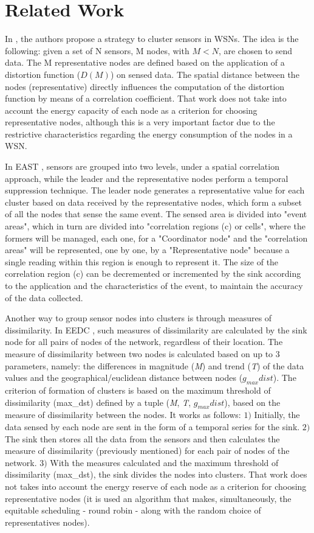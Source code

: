 \documentclass[conference]{IEEEtran}
\begin{document}
\section{Related Work}
\label{related-work}

In \cite{Vuran2004}, the authors propose a strategy to cluster sensors in WSNs.
The idea is the following: given a set of N sensors, M nodes, with $M < N$, are
chosen to send data. The M representative nodes are defined based on the
application of a distortion function ($D(M)$) on sensed data.
The spatial distance between the nodes (representative) directly influences the
computation of the distortion function by means of a correlation coefficient.
That work does not take into account the energy capacity of each node as a
criterion for choosing representative nodes, although this is a very important
factor due to the restrictive characteristics regarding the energy consumption
of the nodes in a WSN.

In EAST \cite{Villas2012}, sensors are grouped into two levels, under a spatial
correlation approach, while the leader and the representative nodes perform a
temporal suppression technique.
The leader node generates a representative value for each cluster based on data
received by the representative nodes, which form a subset of all the nodes that
sense the same event. The sensed area is divided into "event areas", which in
turn are divided into "correlation regions (c) or cells", where the formers will
be managed, each one, for a "Coordinator node" and the "correlation areas" will
be represented, one by one, by a "Representative node" because a single reading
within this region is enough to represent it.
The size of the correlation region (c) can be decremented or incremented by the
sink according to the application and the characteristics of the event, to
maintain the accuracy of the data collected.

Another way to group sensor nodes into clusters is through measures of
dissimilarity.
In EEDC \cite{Liu2007}, such measures of dissimilarity are calculated by the
sink node for all pairs of nodes of the network, regardless of their location.
The measure of dissimilarity between two nodes is calculated based on up to $3$
parameters, namely:
the differences in magnitude (\textit{M}) and trend (\textit{T}) of the data
values and the geographical/euclidean distance between nodes ($g_{max}dist$).
The criterion of formation of clusters is based on the maximum threshold of
dissimilarity (max\_dst) defined by a tuple (\textit{M}, \textit{T},
$g_{max}dist$), based on the measure of dissimilarity between the nodes. It
works as follows: $1)$ Initially, the data sensed by each node are sent in the
form of a temporal series for the sink. $2)$ The sink then stores all the data
from the sensors and then calculates the measure of dissimilarity (previously
mentioned) for each pair of nodes of the network. $3)$ With the measures
calculated and the maximum threshold of dissimilarity (max\_dst), the sink
divides the nodes into clusters. 
That work does not takes into account the energy reserve of each node as a
criterion for choosing representative nodes (it is used an algorithm that makes,
simultaneously, the equitable scheduling - round robin - along with the random
choice of representatives nodes).
\end{document}
